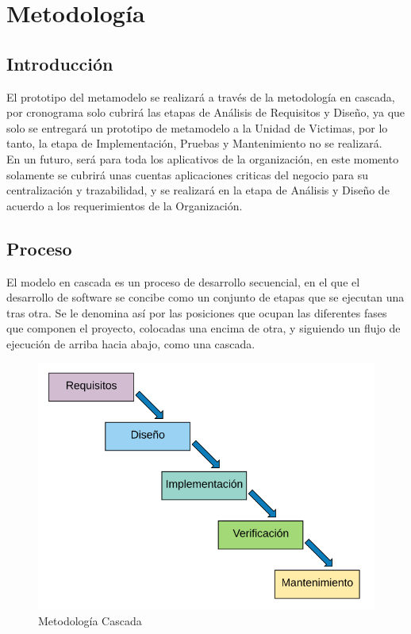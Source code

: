 \chapter{Metodología}

\section{Introducción}
El prototipo del metamodelo se realizará a través de la metodología en cascada, por cronograma solo cubrirá las etapas de Análisis de Requisitos y Diseño, ya que solo se entregará un prototipo de metamodelo a la Unidad de Victimas, por lo tanto, la etapa de Implementación, Pruebas y Mantenimiento no se realizará. 
\\
En un futuro, será para toda los aplicativos de la organización, en este momento solamente se cubrirá unas
cuentas aplicaciones criticas del negocio para su centralización y trazabilidad, y se realizará en la etapa de Análisis y Diseño de acuerdo a los requerimientos de la Organización.

\section{Proceso}
El modelo en cascada es un proceso de desarrollo secuencial, en el que el desarrollo de software se concibe como  un conjunto de etapas que  se ejecutan una tras otra. Se le denomina así por las posiciones que ocupan las diferentes fases que componen el proyecto, colocadas una encima de otra, y siguiendo un flujo de ejecución de arriba hacia abajo, como una cascada.
\newpage

\begin{figure}[h!]
	\centering	\includegraphics[width=0.5\linewidth]{Proyecto/Metodologia/imgs/MetodoCascada}
	\caption{Metodología Cascada \cite{MetSB,ID1,ID2}}
\end{figure}

